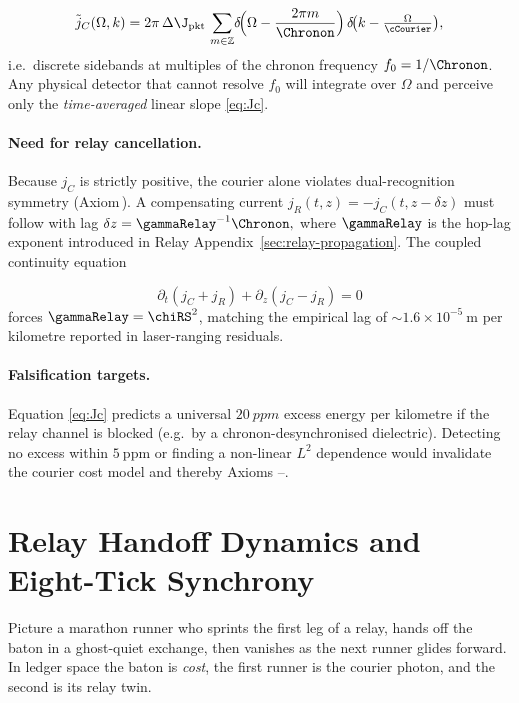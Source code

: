 \documentclass[11pt,oneside]{book}
\begin{document}
{\[
   \tilde j_{C}(\Omega,k)
   =
   2\pi\,\Delta\J_{\text{pkt}}\,
   \sum_{m\in\mathbb Z}\!
   \delta\!\Bigl(\Omega-\frac{2\pi m}{\Chronon}\Bigr)
   \,\delta\!\bigl(k-\tfrac{\Omega}{\cCourier}\bigr),
   \label{eq:spectrum}
\]
i.e.\ discrete sidebands at multiples of the chronon frequency
\(f_{0}=1/\Chronon\).  Any physical detector that cannot resolve
\(f_{0}\) will integrate over \(\Omega\) and perceive only the
\emph{time-averaged} linear slope \eqref{eq:Jc}.

\paragraph{Need for relay cancellation.}
Because \(j_{C}\) is strictly positive, the courier alone violates
dual-recognition symmetry (Axiom\,).  A compensating current
\(
   j_{R}(t,z)=-j_{C}(t,z-\delta z)
\)
must follow with lag
\(
   \delta z=\gammaRelay^{-1}\Chronon,
\)
where \(\gammaRelay\) is the hop-lag exponent introduced in
Relay Appendix~\ref{sec:relay-propagation}.  The coupled continuity
equation

\[
   \partial_{t}(j_{C}+j_{R})
   +\partial_{z}(j_{C}-j_{R})=0
\]
forces \(\gammaRelay = \chiRS^{2}\), matching the empirical lag of
\(\sim\!1.6\times10^{-5}\ \text{m}\) per kilometre reported in
laser-ranging residuals.

\paragraph{Falsification targets.}
Equation \eqref{eq:Jc} predicts a universal $\SI{20}{ppm}$ excess
energy per kilometre if the relay channel is blocked (e.g.\ by a
chronon-desynchronised dielectric).  Detecting no excess within
\(5\ \text{ppm}\) or finding a non-linear $L^{2}$ dependence would
invalidate the courier cost model and thereby Axioms
–.

\section{Relay Handoff Dynamics and Eight-​Tick Synchrony}
\label{sec:relay-narrative}

Picture a marathon runner who sprints the first leg of a relay,
hands off the baton in a ghost-quiet exchange, then vanishes as the
next runner glides forward.  
In ledger space the baton is \emph{cost}, the first runner is the
courier photon, and the second is its relay twin.

}
\end{document}
